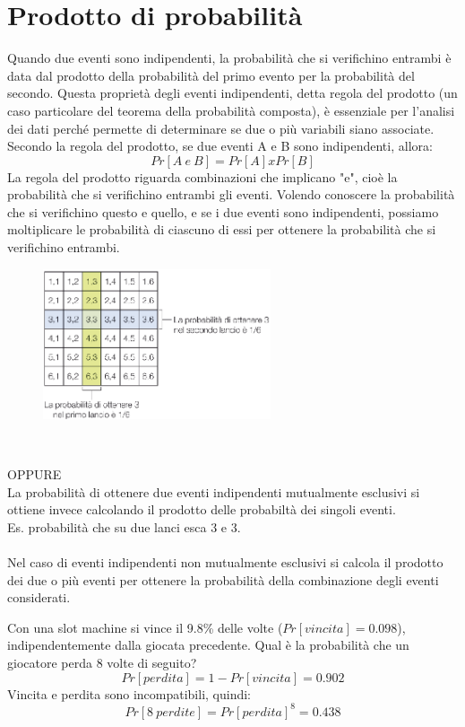\documentclass[10pt, draft]{book}
\newcounter{example}[section]
\begin{document}
\section{Prodotto di probabilità\label{secprodottodiprobabilità}}
Quando due eventi sono indipendenti, la probabilità che si verifichino entrambi è data dal prodotto della probabilità del primo evento per la probabilità del secondo. Questa proprietà degli eventi indipendenti, detta regola del prodotto (un caso particolare del teorema della probabilità composta), è essenziale per l'analisi dei dati perché permette di determinare se due o più variabili siano associate.
\\
Secondo la regola del prodotto, se due eventi A e B sono indipendenti, allora:
\begin{equation}
    Pr[A\ e\ B] = Pr[A] x Pr[B] 
\end{equation}
La regola del prodotto riguarda combinazioni che implicano "e", cioè la probabilità che si verifichino entrambi gli eventi. Volendo conoscere la probabilità che si verifichino questo e quello, e se i due eventi sono indipendenti, possiamo moltiplicare le probabilità di ciascuno di essi per ottenere la probabilità che si verifichino entrambi.
\begin{figure}[h]\label{fig5.6-1}
    \centering
    \includegraphics[width=0.6\textwidth]{fig5.6-1}
    \caption{\small{}}
\end{figure}
\\
\colorbox{lyellow}{\parbox{0.97\textwidth}{OPPURE
\\
La probabilità di ottenere due eventi indipendenti mutualmente esclusivi si ottiene invece calcolando il prodotto delle probabiltà dei singoli eventi.
\\
Es. probabilità che su due lanci esca 3 e 3.
\\
\\
Nel caso di eventi indipendenti non mutualmente esclusivi si calcola il prodotto dei due o più eventi per ottenere la probabilità della combinazione degli eventi considerati.}}
\begin{example}
    Con una slot machine si vince il 9.8\% delle volte ($Pr[vincita] = 0.098$), indipendentemente dalla giocata precedente.
    Qual è la probabilità che un giocatore perda 8 volte di seguito?
    \begin{equation}
        Pr[perdita] = 1 - Pr[vincita] = 0.902
    \end{equation}
    Vincita e perdita sono incompatibili, quindi:
    \begin{equation}
        Pr[8\ perdite] = Pr[perdita]^8 = 0.438
    \end{equation}
\end{example}
\end{document}
